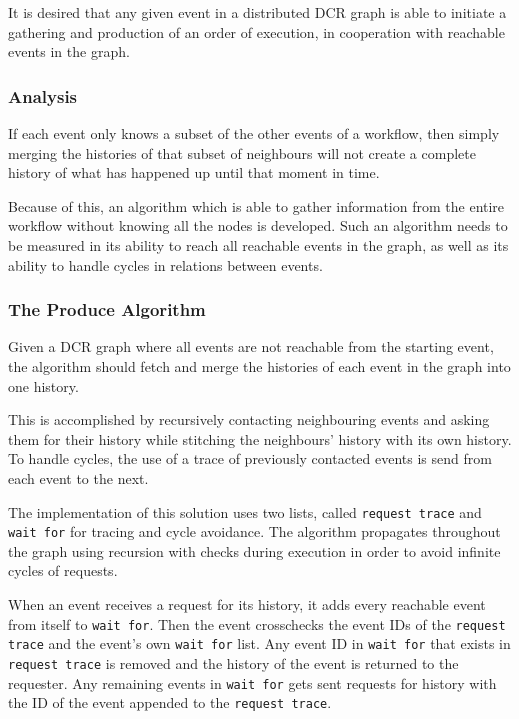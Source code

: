 	It is desired that any given event in a distributed DCR graph is able to initiate a gathering and production of an order of execution, in cooperation with reachable events in the graph. 
	
	\subsubsection{Analysis}
	If each event only knows a subset of the other events of a workflow, then simply merging the histories of that subset of neighbours will not create a complete history of what has happened up until that moment in time. 
	
	Because of this, an algorithm which is able to gather information from the entire workflow without knowing all the nodes is developed. Such an algorithm needs to be measured in its ability to reach all reachable events in the graph, as well as its ability to handle cycles in relations between events. 
	
	\subsubsection{The Produce Algorithm}
	Given a DCR graph where all events are not reachable from the starting event, the algorithm should fetch and merge the histories of each event in the graph into one history.
	
	This is accomplished by recursively contacting neighbouring events and asking them for their history while stitching the neighbours' history with its own history. To handle cycles, the use of a trace of previously contacted events is send from each event to the next.
	
	\newpar The implementation of this solution uses two lists, called \texttt{request trace} and \texttt{wait for} for tracing and cycle avoidance.
	The algorithm propagates throughout the graph using recursion with checks during execution in order to avoid infinite cycles of requests. 
	
	When an event receives a request for its history, it adds every reachable event from itself to \texttt{wait for}. Then the event crosschecks the event IDs of the \texttt{request trace} and the event's own \texttt{wait for} list. Any event ID in \texttt{wait for} that exists in \texttt{request trace} is removed and the history of the event is returned to the requester. Any remaining events in \texttt{wait for} gets sent requests for history with the ID of the event appended to the \texttt{request trace}. 
	
